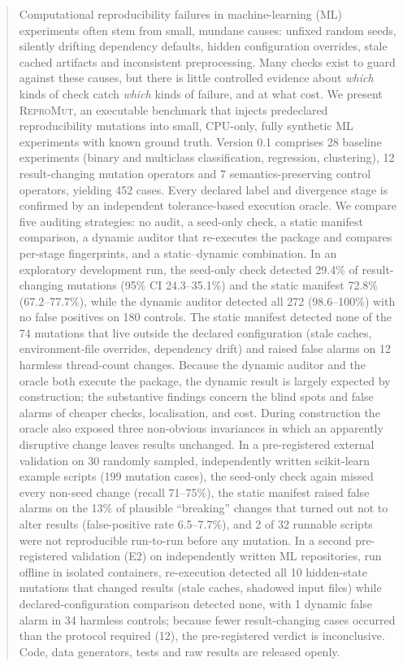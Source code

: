 \documentclass[11pt]{article}
\newcommand{\RM}{\textsc{ReproMut}}
\begin{document}
\begin{abstract}
\noindent Computational reproducibility failures in machine-learning (ML) experiments often stem from small, mundane causes: unfixed random seeds, silently drifting dependency defaults, hidden configuration overrides, stale cached artifacts and inconsistent preprocessing. Many checks exist to guard against these causes, but there is little controlled evidence about \emph{which} kinds of check catch \emph{which} kinds of failure, and at what cost. We present \RM, an executable benchmark that injects predeclared reproducibility mutations into small, CPU-only, fully synthetic ML experiments with known ground truth. Version 0.1 comprises 28 baseline experiments (binary and multiclass classification, regression, clustering), 12 result-changing mutation operators and 7 semantics-preserving control operators, yielding 452 cases. Every declared label and divergence stage is confirmed by an independent tolerance-based execution oracle. We compare five auditing strategies: no audit, a seed-only check, a static manifest comparison, a dynamic auditor that re-executes the package and compares per-stage fingerprints, and a static--dynamic combination. In an exploratory development run, the seed-only check detected 29.4\% of result-changing mutations (95\% CI 24.3--35.1\%) and the static manifest 72.8\% (67.2--77.7\%), while the dynamic auditor detected all 272 (98.6--100\%) with no false positives on 180 controls. The static manifest detected none of the 74 mutations that live outside the declared configuration (stale caches, environment-file overrides, dependency drift) and raised false alarms on 12 harmless thread-count changes. Because the dynamic auditor and the oracle both execute the package, the dynamic result is largely expected by construction; the substantive findings concern the blind spots and false alarms of cheaper checks, localisation, and cost. During construction the oracle also exposed three non-obvious invariances in which an apparently disruptive change leaves results unchanged. In a pre-registered external validation on 30 randomly sampled, independently written scikit-learn example scripts (199 mutation cases), the seed-only check again missed every non-seed change (recall 71--75\%), the static manifest raised false alarms on the 13\% of plausible ``breaking'' changes that turned out not to alter results (false-positive rate 6.5--7.7\%), and 2 of 32 runnable scripts were not reproducible run-to-run before any mutation. In a second pre-registered validation (E2) on independently written ML repositories, run offline in isolated containers, re-execution detected all 10 hidden-state mutations that changed results (stale caches, shadowed input files) while declared-configuration comparison detected none, with 1 dynamic false alarm in 34 harmless controls; because fewer result-changing cases occurred than the protocol required (12), the pre-registered verdict is inconclusive. Code, data generators, tests and raw results are released openly.
\end{abstract}
\end{document}
